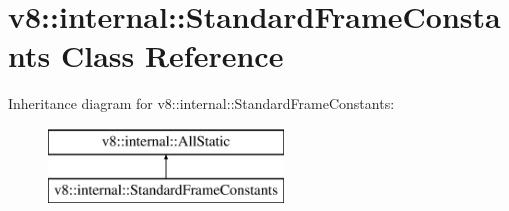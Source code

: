 \hypertarget{classv8_1_1internal_1_1_standard_frame_constants}{}\section{v8\+:\+:internal\+:\+:Standard\+Frame\+Constants Class Reference}
\label{classv8_1_1internal_1_1_standard_frame_constants}
Inheritance diagram for v8\+:\+:internal\+:\+:Standard\+Frame\+Constants\+:\begin{figure}[H]
\begin{center}
\leavevmode
\includegraphics[height=2.000000cm]{classv8_1_1internal_1_1_standard_frame_constants}
\end{center}
\end{figure}
